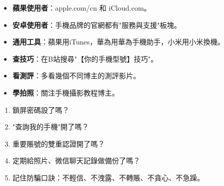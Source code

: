 

\begin{itemize}
  \item \textbf{蘋果使用者}：apple.com/cn 和 iCloud.com。
  \item \textbf{安卓使用者}：手機品牌的官網都有"服務與支援"板塊。
  \item \textbf{通用工具}：蘋果用iTunes，華為用華為手機助手，小米用小米換機。
\end{itemize}


\begin{itemize}
  \item \textbf{查技巧}：在B站搜尋"【你的手機型號】技巧"。
  \item \textbf{看測評}：多看幾個不同博主的測評影片。
  \item \textbf{學拍照}：關注手機攝影教程博主。
\end{itemize}


\begin{enumerate}
  \item 鎖屏密碼設了嗎？
  \item "查詢我的手機"開了嗎？
  \item 重要賬號的雙重認證開了嗎？
  \item 定期給照片、微信聊天記錄做備份了嗎？
  \item 記住防騙口訣：不輕信、不洩露、不轉賬、不貪心、不急躁。
\end{enumerate}
